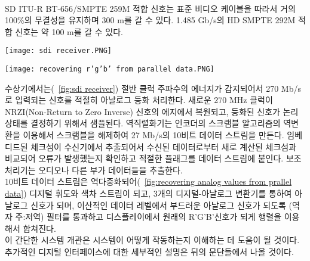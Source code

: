 \\
SD ITU-R BT-656/SMPTE 259M 적합 신호는 표준 비디오 케이블을 따라서 거의 100\%의 무결성을 유지하며 300 m를 갈 수 있다. 1.485 Gb/s의 HD SMPTE 292M 적합 신호는 약 100 m를 갈 수 있다.
\\
\begin{figure*}[!t]
    \centering
    \texttt{[image: sdi receiver.PNG]}
    \caption{SDI 수신기 - 비디오 데이터를 역직렬화하여 다시 병렬로 만든다}\label{fig:sdi receiver}
\end{figure*}
\begin{figure*}[h!]
    \centering
    \texttt{[image: recovering r'g'b' from parallel data.PNG]}
    \caption{병렬 데이터에서 아날로그 R'G'B'를 복원}\label{fig:recovering analog values from prallel data}
\end{figure*}
수상기에서는(\figurename~\ref{fig:sdi receiver}) 절반 클럭 주파수의 에너지가 감지되어서 270 Mb/s로 입력되는 신호를 적절히 아날로그 등화 처리한다. 새로운 270 MHz 클럭이 NRZI(Non-Return to Zero Inverse) 신호의 에지에서 복원되고, 등화된 신호가 논리 상태를 결정하기 위해서 샘플된다.
역직렬화기는 인코더의 스크램블 알고리즘의 역변환을 이용해서 스크램블을 해제하여 27 Mb/s의 10비트 데이터 스트림을 만든다. 임베디드된 체크섬이 수신기에서 추출되어서 수신된 데이터로부터 새로 계산된 체크섬과 비교되어 오류가 발생했는지 확인하고 적절한 플래그를 데이터 스트림에 붙인다.
보조 처리기는 오디오나 다른 부가 데이터들을 추출한다.
\\
10비트 데이터 스트림은 역다중화되어(\figurename~\ref{fig:recovering analog values from prallel data}) 디지털 휘도와 색차 스트림이 되고, 3개의 디지털-아날로그 변환기를 통하여 아날로그 신호가 되며, 이산적인 데이터 레벨에서 부드러운 아날로그 신호가 되도록 (역자 주:저역) 필터를 통과하고 디스플레이에서 원래의 R'G'B'신호가 되게 행렬을 이용해서 합쳐진다.
\\
이 간단한 시스템 개관은 시스템이 어떻게 작동하는지 이해하는 데 도움이 될 것이다. 추가적인 디지털 인터페이스에 대한 세부적인 설명은 뒤의 문단들에서 나올 것이다.

